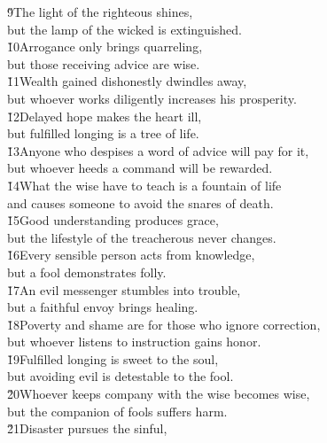 \begin{poetry}
\poeml \v{9}The light of the righteous shines, \\
\poemll    but the lamp of the wicked is extinguished. \\
\poeml \v{10}Arrogance only brings quarreling, \\
\poemll    but those receiving advice are wise. \\
\poeml \v{11}Wealth gained dishonestly dwindles away, \\
\poemll    but whoever works diligently increases his prosperity. \\
\poeml \v{12}Delayed hope makes the heart ill, \\
\poemll    but fulfilled longing is a tree of life. \\
\poeml \v{13}Anyone who despises a word of advice will pay for it, \\
\poemll    but whoever heeds a command will be rewarded. \\
\poeml \v{14}What the wise have to teach is a fountain of life \\
\poemll    and causes someone to avoid the snares of death. \\
\poeml \v{15}Good understanding produces grace, \\
\poemll    but the lifestyle of the treacherous never changes. \\
\poeml \v{16}Every sensible person acts from knowledge, \\
\poemll    but a fool demonstrates folly. \\
\poeml \v{17}An evil messenger stumbles into trouble, \\
\poemll    but a faithful envoy brings healing. \\
\poeml \v{18}Poverty and shame are for those who ignore correction, \\
\poemll    but whoever listens to instruction gains honor. \\
\poeml \v{19}Fulfilled longing is sweet to the soul, \\
\poemll    but avoiding evil is detestable to the fool. \\
\poeml \v{20}Whoever keeps company with the wise becomes wise, \\
\poemll    but the companion of fools suffers harm. \\
\poeml \v{21}Disaster pursues the sinful, \\

\end{poetry}
